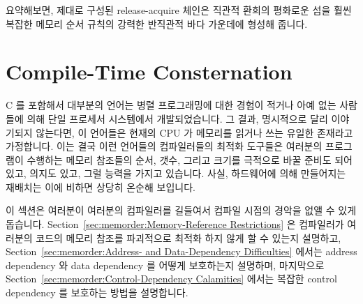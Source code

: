 요약해보면, 제대로 구성된 release-acquire 체인은 직관적 환희의 평화로운 섬을
훨씬 복잡한 메모리 순서 규칙의 강력한 반직관적 바다 가운데에 형성해 줍니다.

\section{Compile-Time Consternation}
\label{sec:memorder:Compile-Time Consternation}

C 를 포함해서 대부분의 언어는 병렬 프로그래밍에 대한 경험이 적거나 아예 없는
사람들에 의해 단일 프로세서 시스템에서 개발되었습니다.
그 결과, 명시적으로 달리 이야기되지 않는다면, 이 언어들은 현재의 CPU 가
메모리를 읽거나 쓰는 유일한 존재라고 가정합니다.
이는 결국 이런 언어들의 컴파일러들의 최적화 도구들은 여러분의 프로그램이
수행하는 메모리 참조들의 순서, 갯수, 그리고 크기를 극적으로 바꿀 준비도
되어있고, 의지도 있고, 그럴 능력을 가지고 있습니다.
사실, 하드웨어에 의해 만들어지는 재배치는 이에 비하면 상당히 온순해 보입니다.

이 섹션은 여러분이 여러분의 컴파일러를 길들여서 컴파일 시점의 경악을 없앨 수
있게 돕습니다.
Section~\ref{sec:memorder:Memory-Reference Restrictions}
은 컴파일러가 여러분의 코드의 메모리 참조를 파괴적으로 최적화 하지 않게 할 수
있는지 설명하고,
Section~\ref{sec:memorder:Address- and Data-Dependency Difficulties}
에서는 address dependency 와 data dependency 를 어떻게 보호하는지 설명하며,
마지막으로
Section~\ref{sec:memorder:Control-Dependency Calamities}
에서는 복잡한 control dependency 를 보호하는 방법을 설명합니다.

